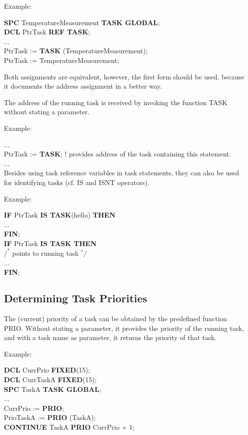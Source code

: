 Example:

{\bf SPC} TemperatureMeasurement {\bf TASK GLOBAL};\\
{\bf DCL} PtrTask {\bf REF TASK};\\
...\\
PtrTask := {\bf TASK} (TemperatureMeasurement);\\
PtrTask := TemperatureMeasurement;

Both assignments are equivalent, however, the first form should be used,
because it documents the address assignment in a better way.

The address of the running task is received by invoking the function
TASK without stating a parameter.

Example:

...\\
PtrTask := {\bf TASK}; \x ! provides address of the task containing
this statement.\\
...\\

Besides using task reference variables in task statements, they can
also be used for identifying tasks (cf. IS and ISNT operators).

Example:

{\bf IF} PtrTask {\bf IS TASK}(hello) {\bf THEN}\\
\x \x ...\\
{\bf FIN};\\
{\bf IF} PtrTask {\bf IS TASK THEN}\\
\x \x $/^*$ points to running task $^*/$\\
\x \x ...\\
{\bf FIN};

\subsection{Determining Task Priorities}   %

The (current) priority of a task can be obtained by the predefined
function PRIO. Without stating a parameter, it provides the priority of
the running task, and with a task name as parameter, it returns the
priority of that task.

Example:

{\bf DCL} CurrPrio {\bf FIXED}(15);\\
{\bf DCL} CurrTaskA {\bf FIXED}(15);\\
{\bf SPC} TaskA {\bf TASK GLOBAL};\\
...\\
CurrPrio := {\bf PRIO};\\
PrioTaskA := {\bf PRIO} (TaskA);\\
{\bf CONTINUE} TaskA {\bf PRIO} CurrPrio + 1;

